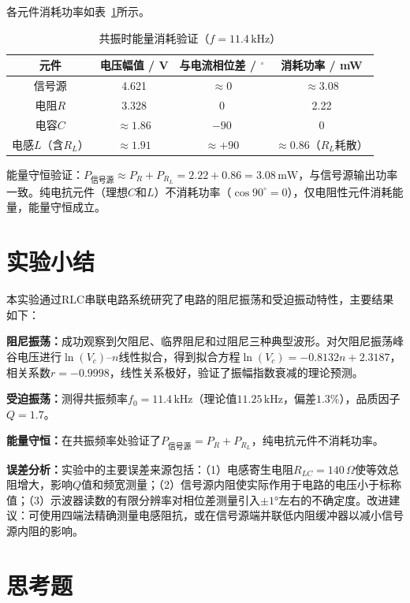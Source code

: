 \documentclass[12pt, a4paper]{article}
\begin{document}
各元件消耗功率如表~\ref{tab:energy}所示。

\begin{table}[H]
\centering
\caption{共振时能量消耗验证（$f = 11.4\,\mathrm{kHz}$）}
\label{tab:energy}
\begin{tabular}{cccc}
\toprule
元件 & 电压幅值 / V & 与电流相位差 / ${}^\circ$ & 消耗功率 / mW \\
\midrule
信号源      & 4.621  & $\approx 0$ & $\approx 3.08$ \\
电阻$R$     & 3.328  & 0           & 2.22 \\
电容$C$     & $\approx 1.86$ & $-90$ & 0 \\
电感$L$（含$R_L$） & $\approx 1.91$ & $\approx +90$ & $\approx 0.86$（$R_L$耗散） \\
\bottomrule
\end{tabular}
\end{table}

能量守恒验证：$P_{\text{信号源}} \approx P_R + P_{R_L} = 2.22 + 0.86 = 3.08\,\mathrm{mW}$，与信号源输出功率一致。纯电抗元件（理想$C$和$L$）不消耗功率（$\cos 90^{\circ} = 0$），仅电阻性元件消耗能量，能量守恒成立。

\section*{实验小结}

本实验通过RLC串联电路系统研究了电路的阻尼振荡和受迫振动特性，主要结果如下：

\textbf{阻尼振荡：}成功观察到欠阻尼、临界阻尼和过阻尼三种典型波形。对欠阻尼振荡峰谷电压进行$\ln(V_c)$--$n$线性拟合，得到拟合方程$\ln(V_c) = -0.8132n + 2.3187$，相关系数$r = -0.9998$，线性关系极好，验证了振幅指数衰减的理论预测。

\textbf{受迫振荡：}测得共振频率$f_0 = 11.4\,\mathrm{kHz}$（理论值$11.25\,\mathrm{kHz}$，偏差$1.3\%$），品质因子$Q = 1.7$。

\textbf{能量守恒：}在共振频率处验证了$P_{\text{信号源}} = P_R + P_{R_L}$，纯电抗元件不消耗功率。

\textbf{误差分析：}实验中的主要误差来源包括：（1）电感寄生电阻$R_{LC} = 140\,\Omega$使等效总阻增大，影响$Q$值和频宽测量；（2）信号源内阻使实际作用于电路的电压小于标称值；（3）示波器读数的有限分辨率对相位差测量引入$\pm 1°$左右的不确定度。改进建议：可使用四端法精确测量电感阻抗，或在信号源端并联低内阻缓冲器以减小信号源内阻的影响。

\section*{思考题}
\end{document}
